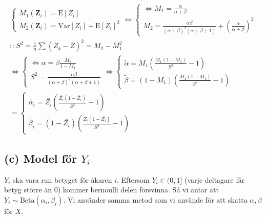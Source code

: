 \documentclass{assignment}
\begin{document}
\begin{align*}
    \left\{\begin{matrix}
        M_1(\mathbf{Z}_i)  = \text{E}[Z_i]
        \\ M_2(\mathbf{Z}_i) = \text{Var}[Z_i]+\text{E}[Z_i]^2
    \end{matrix}\right.
    \Longleftrightarrow \left\{\begin{matrix}
        \Leftrightarrow M_1 = \frac{\alpha}{\alpha+\beta}
        \\ M_2 = \frac{\alpha\beta}{(\alpha+\beta)^2(\alpha+\beta+1)}+(\frac{\alpha}{\alpha+\beta})^2
    \end{matrix}\right.
    \\ :: S^2=\frac{1}{n}\sum (Z_{k}-\bar{Z})^2 = M_2-M_1^2
    \\ \Longleftrightarrow \left\{\begin{matrix}
        \Leftrightarrow \alpha = \beta\frac{M_1}{1-M_1}
        \\ S^2 = \frac{\alpha\beta}{(\alpha+\beta)^2(\alpha+\beta+1)}
    \end{matrix}\right.
    \Longleftrightarrow \left\{\begin{matrix}
        \widetilde{\alpha} = M_1\left(\frac{M_1(1-M_1)}{S^2}-1\right)
        \\ \widetilde{\beta} = (1-M_1)\left(\frac{M_1(1-M_1)}{S^2}-1\right)
    \end{matrix}\right.
    \\ = \left\{\begin{matrix}
        \widetilde{\alpha_i} = \bar{Z_i}\left(\frac{\bar{Z_i}(1-\bar{Z_i})}{S^2}-1\right)
        \\ \widetilde{\beta_i} = (1-\bar{Z_i})\left(\frac{\bar{Z_i}(1-\bar{Z_i})}{S^2}-1\right)
    \end{matrix}\right.
\end{align*}

\subsection*{(c) Model för $Y_i$}
$Y_i$ ska vara run betyget för åkaren $i$. Eftersom $Y_i\in(0,1]$ (varje deltagare får betyg större än 0) kommer bernoulli delen försvinna. Så vi antar att $Y_i\sim \text{Beta}(\alpha_i,\beta_i)$. 
Vi använder samma metod som vi använde för att skatta $\alpha,\beta$ för $X$.
\end{document}
